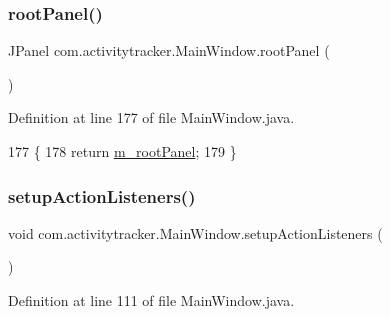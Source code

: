 \subsubsection{\texorpdfstring{root\+Panel()}{rootPanel()}}
{\footnotesize\ttfamily J\+Panel com.\+activitytracker.\+Main\+Window.\+root\+Panel (\begin{DoxyParamCaption}{ }\end{DoxyParamCaption})\hspace{0.3cm}{\ttfamily [package]}}



Definition at line 177 of file Main\+Window.\+java.


\begin{DoxyCode}
177                        \{
178         \textcolor{keywordflow}{return} \mbox{\hyperlink{classcom_1_1activitytracker_1_1_main_window_ac3d61c032aef87f12b1ae6f7dbf482c3}{m\_rootPanel}};
179     \}
\end{DoxyCode}
\mbox{\label{classcom_1_1activitytracker_1_1_main_window_a76b3e8567b228ccd26f09c15ebaddb72}} 
\subsubsection{\texorpdfstring{setup\+Action\+Listeners()}{setupActionListeners()}}
{\footnotesize\ttfamily void com.\+activitytracker.\+Main\+Window.\+setup\+Action\+Listeners (\begin{DoxyParamCaption}{ }\end{DoxyParamCaption})\hspace{0.3cm}{\ttfamily [private]}}



Definition at line 111 of file Main\+Window.\+java.


